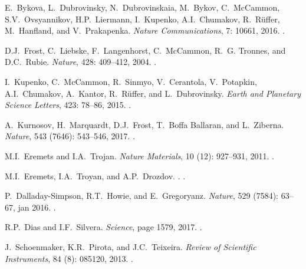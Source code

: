 \documentclass[aip,rsi,reprint,graphicx]{revtex4-1} %
\begin{document}
\begin{thebibliography}{57}
E.~Bykova, L.~Dubrovinsky, N.~Dubrovinskaia, M.~Bykov, C.~McCammon, S.V.~Ovsyannikov, H.P.~Liermann, I.~Kupenko, A.I.~Chumakov, R.~R{\"{u}}ffer,
  M.~Hanfland, and V.~Prakapenka.
\newblock \emph{Nature Communications}, 7: 10661, 2016.
\newblock {}.

D.J.~Frost, C.~Liebske, F.~Langenhorst, C.~McCammon, R.~G. Tronnes, and D.C.~Rubie.
\newblock \emph{Nature}, 428: 409--412, 2004.
\newblock {}.

I.~Kupenko, C.~McCammon, R.~Sinmyo, V.~Cerantola, V.~Potapkin, A.I.~Chumakov,
  A.~Kantor, R.~R{\"{u}}ffer, and L.~Dubrovinsky.
\newblock \emph{Earth and Planetary Science Letters}, 423: 78--86,
  2015.
\newblock {}.

A.~Kurnosov, H.~Marquardt, D.J.~Frost, T.~Boffa Ballaran, and L.~Ziberna.
\newblock \emph{Nature}, 543 (7646): 543--546, 2017.
\newblock {}.

M.I.~Eremets and I.A.~Trojan.
\newblock \emph{Nature Materials}, 10 (12): 927--931,
  2011.
\newblock {}.

M.I.~Eremets, I.A.~Troyan, and A.P.~Drozdov.
.
.

P.~Dalladay-Simpson, R.T.~Howie, and E.~Gregoryanz.
\newblock \emph{Nature}, 529 (7584): 63--67, jan 2016.
\newblock {}.

R.P.~Dias and I.F.~Silvera.
\newblock \emph{Science}, page 1579, 2017.
\newblock {}.

J.~Schoenmaker, K.R.~Pirota, and J.C.~Teixeira.
\newblock \emph{Review of Scientific Instruments}, 84 (8):
  085120, 2013.
\newblock {}.


\end{thebibliography}
\end{document}
